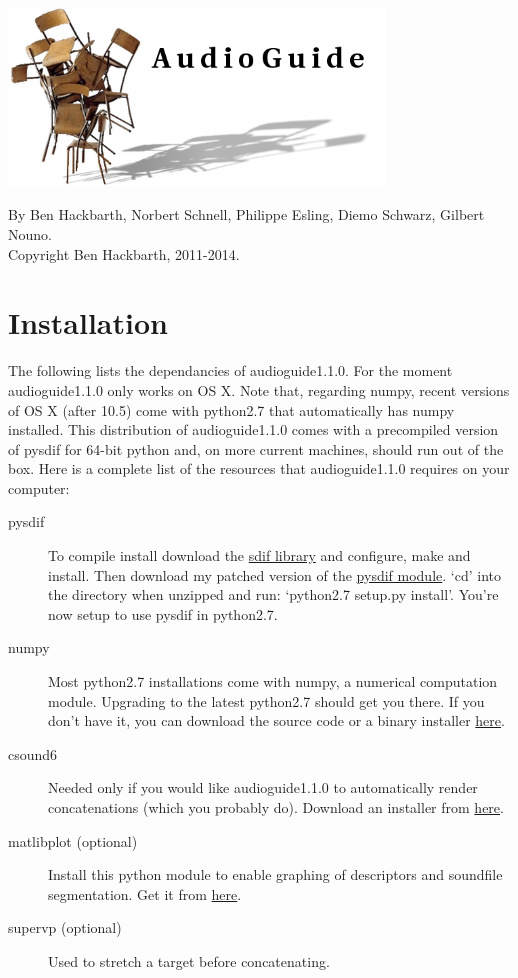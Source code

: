 \documentclass{article}
\newcommand{\ag}{audioguide1.1.0\xspace}
\begin{document}
\setlength{\parskip}{10pt}
\begin{spacing}{1.2}
\begin{center}
\includegraphics[width=0.75\textwidth]{image0.png}

By Ben Hackbarth, Norbert Schnell, Philippe Esling, Diemo Schwarz, Gilbert Nouno. \\
Copyright Ben Hackbarth, 2011-2014.
\end{center}

\tableofcontents


\section{Installation}
The following lists the dependancies of \ag.  For the moment \ag only works on OS X.  Note that, regarding numpy, recent versions of OS X  (after 10.5) come with python2.7 that automatically has numpy installed.  This distribution of \ag comes with a precompiled version of pysdif for 64-bit python and, on more current machines, should run out of the box.  Here is a complete list of the resources that \ag requires on your computer:
\begin{description}
\item[pysdif] To compile install download the \href{http://sourceforge.net/projects/sdif/files/sdif/}{sdif library} and configure, make and install.  Then download my patched version of the \href{http://www.benhackbarth.com/audioGuide/release/pysdif-0.1.4-patch.zip}{pysdif module}.  `cd' into the directory when unzipped and run: `python2.7 setup.py install'.  You're now setup to use pysdif in python2.7.
\item[numpy] Most python2.7 installations come with numpy, a numerical computation module.  Upgrading to the latest python2.7 should get you there.  If you don't have it, you can download the source code or a binary installer \href{http://sourceforge.net/projects/numpy/files/NumPy/}{here}.
\item[csound6] Needed only if you would like \ag to automatically render concatenations (which you probably do).  Download an installer from \href{http://csound.github.io/download.html}{here}.
\item[matlibplot (optional)] Install this python module to enable graphing of descriptors and soundfile segmentation.  Get it from \href{http://matplotlib.org/downloads.html}{here}.
\item[supervp (optional)] Used to stretch a target before concatenating.
\end{description}


\end{spacing}
\end{document}

